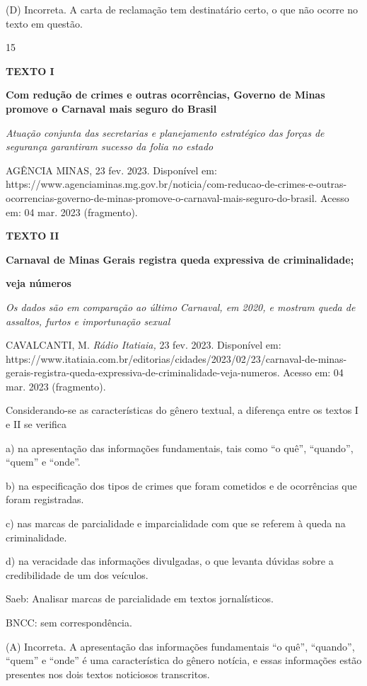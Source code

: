 (D) Incorreta. A carta de reclamação tem destinatário certo, o que não
ocorre no texto em questão.

\num{15}

\textbf{TEXTO I}

\textbf{Com redução de crimes e outras ocorrências, Governo de Minas
promove o Carnaval mais seguro do Brasil}

\emph{Atuação conjunta das secretarias e planejamento estratégico das
forças de segurança garantiram sucesso da folia no estado}

AGÊNCIA MINAS, 23 fev. 2023. Disponível em:
https://www.agenciaminas.mg.gov.br/noticia/com-reducao-de-crimes-e-outras-ocorrencias-governo-de-minas-promove-o-carnaval-mais-seguro-do-brasil.
Acesso em: 04 mar. 2023 (fragmento).

\textbf{TEXTO II}

\textbf{Carnaval de Minas Gerais registra queda expressiva de
criminalidade;}

\textbf{veja números}

\emph{Os dados são em comparação ao último Carnaval, em 2020, e mostram
queda de assaltos, furtos e importunação sexual}

CAVALCANTI, M. \emph{Rádio Itatiaia,} 23 fev. 2023. Disponível em:
https://www.itatiaia.com.br/editorias/cidades/2023/02/23/carnaval-de-minas-gerais-registra-queda-expressiva-de-criminalidade-veja-numeros.
Acesso em: 04 mar. 2023 (fragmento).

Considerando-se as características do gênero textual, a diferença entre
os textos I e II se verifica

a) na apresentação das informações fundamentais, tais como ``o quê'',
``quando'', ``quem'' e ``onde''.

b) na especificação dos tipos de crimes que foram cometidos e de
ocorrências que foram registradas.

c) nas marcas de parcialidade e imparcialidade com que se referem à
queda na criminalidade.

d) na veracidade das informações divulgadas, o que levanta dúvidas sobre
a credibilidade de um dos veículos.

Saeb: Analisar marcas de parcialidade em textos jornalísticos.

BNCC: sem correspondência.

(A) Incorreta. A apresentação das informações fundamentais ``o quê'',
``quando'', ``quem'' e ``onde'' é uma característica do gênero notícia,
e essas informações estão presentes nos dois textos noticiosos
transcritos.

